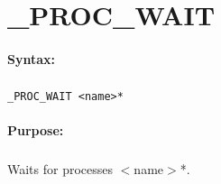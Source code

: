 
\newpage
\section{\_PROC\_WAIT}
\label{cmd:_PROC_WAIT}

\paragraph{Syntax:}
\subparagraph{}
\texttt{\_PROC\_WAIT <name>*}

\paragraph{Purpose:}
\subparagraph{}
Waits for processes $<$name$>$*.